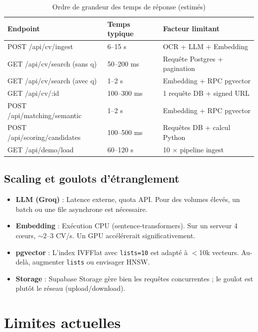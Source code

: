 \documentclass[11pt,a4paper]{report}
\begin{document}
\begin{table}[H]
  \centering
  \caption{Ordre de grandeur des temps de réponse (estimés)}
  \small
  \begin{tabular}{@{}lp{3cm}p{4cm}@{}}
    \toprule
    \textbf{Endpoint} & \textbf{Temps typique} & \textbf{Facteur limitant} \\
    \midrule
    POST /api/cv/ingest & 6--15 s & OCR + LLM + Embedding \\
    GET /api/cv/search (sans q) & 50--200 ms & Requête Postgres + pagination \\
    GET /api/cv/search (avec q) & 1--2 s & Embedding + RPC pgvector \\
    GET /api/cv/:id & 100--300 ms & 1 requête DB + signed URL \\
    POST /api/matching/semantic & 1--2 s & Embedding + RPC pgvector \\
    POST /api/scoring/candidates & 100--500 ms & Requêtes DB + calcul Python \\
    GET /api/demo/load & 60--120 s & 10 $\times$ pipeline ingest \\
    \bottomrule
  \end{tabular}
\end{table}

\subsection{Scaling et goulots d'étranglement}

\begin{itemize}[leftmargin=*]
  \item \textbf{LLM (Groq)} : Latence externe, quota API. Pour des volumes élevés, un batch ou une file asynchrone est nécessaire.
  \item \textbf{Embedding} : Exécution CPU (sentence-transformers). Sur un serveur 4 cœurs, $\sim$2--3 CV/s. Un GPU accélérerait significativement.
  \item \textbf{pgvector} : L'index IVFFlat avec \texttt{lists=10} est adapté à $<$10k vecteurs. Au-delà, augmenter \texttt{lists} ou envisager HNSW.
  \item \textbf{Storage} : Supabase Storage gère bien les requêtes concurrentes ; le goulot est plutôt le réseau (upload/download).
\end{itemize}

\section{Limites actuelles}
\end{document}
